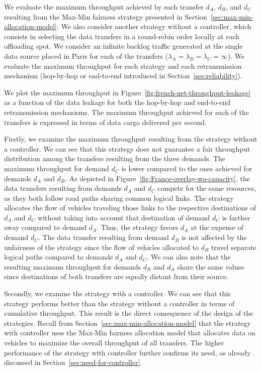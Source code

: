 We evaluate the maximum throughput achieved by each transfer $d_A$, $d_B$, and $d_C$ resulting from the \textsf{Max-Min fairness} strategy presented in Section~\ref{sec:max-min-allocation-model}. We also consider another strategy without a controller, which consists in selecting the data transfers in a round-robin order locally at each offloading spot. We consider an infinite backlog traffic generated at the single data source placed in Paris for each of the transfers (\ie $\lambda_A=\lambda_B=\lambda_C=\infty$). We evaluate the maximum throughput for each strategy and each retransmission mechanism (\textsf{hop-by-hop} or \textsf{end-to-end} introduced in Section~\ref{sec:reliability}). 

We plot the maximum throughput in Figure~\ref{fig:french-net-throughput-leakage} as a function of the data leakage for both the \textsf{hop-by-hop} and \textsf{end-to-end} retransmission mechanisms. The maximum throughput achieved for each of the transfers is expressed in terms of data cargo delivered per second.

Firstly, we examine the maximum throughput resulting from the strategy without a controller. We can see that this strategy does not guarantee a fair throughput distribution among the transfers resulting from the three demands. The maximum throughput for demand $d_C$ is lower compared to the ones achieved for demands $d_A$ and $d_B$. As depicted in Figure~\ref{fig:France-overlay-wo-capacity}, the data transfers resulting from demands $d_A$ and $d_C$ compete for the same resources, as they both follow road paths sharing common logical links. The strategy allocates the flow of vehicles traveling those links to the respective destinations of $d_A$ and $d_C$ without taking into account that destination of demand $d_C$ is farther away compared to demand $d_A$. Thus, the strategy favors $d_A$ at the expense of demand $d_C$. The data transfer resulting from demand $d_B$ is not affected by the unfairness of the strategy since the flow of vehicles allocated to $d_B$ travel separate logical paths compared to demands $d_A$ and $d_C$. We can also note that the resulting maximum throughput for demands $d_B$ and $d_A$ share the same values since destinations of both transfers are equally distant from their source.

Secondly, we examine the strategy with a controller. We can see that this strategy performs better than the strategy without a controller in terms of cumulative throughput. This result is the direct consequence of the design of the strategies. Recall from Section~\ref{sec:max-min-allocation-model} that the strategy with controller uses the \textsf{Max-Min fairness} allocation model that allocates data on vehicles to maximize the overall throughput of all transfers. The higher performance of the strategy with controller further confirms its need, as already discussed in Section~\ref{sec:need-for-controller}. 

